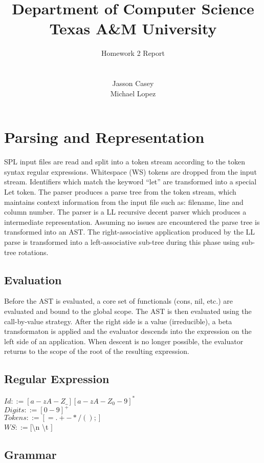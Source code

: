 \documentclass{article}
\title{
Department of Computer Science \\Texas A\&M University}
\author{\LARGE Homework 2 Report\\ \\
\\Jasson Casey
\\Michael Lopez }
\begin{document}
\maketitle

\section{Parsing and Representation}

SPL input files are read and split into a token stream according to the token
syntax regular expressions. Whitespace (WS) tokens are dropped from the input
stream. Identifiers which match the keyword ``let'' are transformed into a 
special Let token. The parser produces a parse tree from the token stream,
which maintains context information from the input file such as: filename, line
and column number. The parser is a LL recursive decent parser which produces a 
intermediate representation. Assuming no issues are encountered the parse
tree is transformed into an AST. The right-associative application produced by
the LL parse is transformed into a left-associative sub-tree during this phase
using sub-tree rotations.

\subsection{Evaluation}
Before the AST is evaluated, a core set of functionals (cons, nil, etc.) are
evaluated and bound to the global scope. The AST is then evaluated using the
call-by-value strategy. After the right side is a value (irreducible),
a beta transformaton is applied and the evaluator descends into the expression
on the left side of an application. When descent is no longer possible, the
evaluator returns to the scope of the root of the resulting expression.

\subsection{Regular Expression}

$Id ::= [a-zA-Z\_][a-zA-Z_0-9]^{*}$\\
$Digits ::= [0-9]^{+}$\\
$Tokens ::= [=.+-*/();]$\\
$WS ::= [$\textbackslash n \textbackslash t $]$

\subsection{Grammar}
\end{document}
